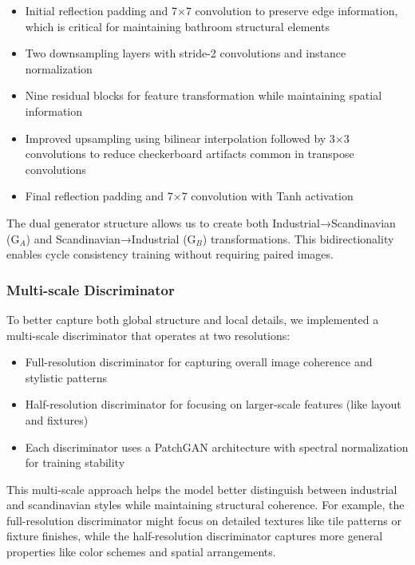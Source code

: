 \documentclass[twocolumn,superscriptaddress,aps]{revtex4-1}
\begin{document}
\begin{itemize}
    \item Initial reflection padding and 7×7 convolution to preserve edge information, which is critical for maintaining bathroom structural elements
    \item Two downsampling layers with stride-2 convolutions and instance normalization
    \item Nine residual blocks for feature transformation while maintaining spatial information
    \item Improved upsampling using bilinear interpolation followed by 3×3 convolutions to reduce checkerboard artifacts common in transpose convolutions
    \item Final reflection padding and 7×7 convolution with Tanh activation
\end{itemize}

The dual generator structure allows us to create both Industrial→Scandinavian (G$_A$) and Scandinavian→Industrial (G$_B$) transformations. This bidirectionality enables cycle consistency training without requiring paired images.

\subsubsection{Multi-scale Discriminator}

To better capture both global structure and local details, we implemented a multi-scale discriminator that operates at two resolutions:

\begin{itemize}
    \item Full-resolution discriminator for capturing overall image coherence and stylistic patterns
    \item Half-resolution discriminator for focusing on larger-scale features (like layout and fixtures)
    \item Each discriminator uses a PatchGAN architecture with spectral normalization for training stability
\end{itemize}

This multi-scale approach helps the model better distinguish between industrial and scandinavian styles while maintaining structural coherence. For example, the full-resolution discriminator might focus on detailed textures like tile patterns or fixture finishes, while the half-resolution discriminator captures more general properties like color schemes and spatial arrangements.
\end{document}
